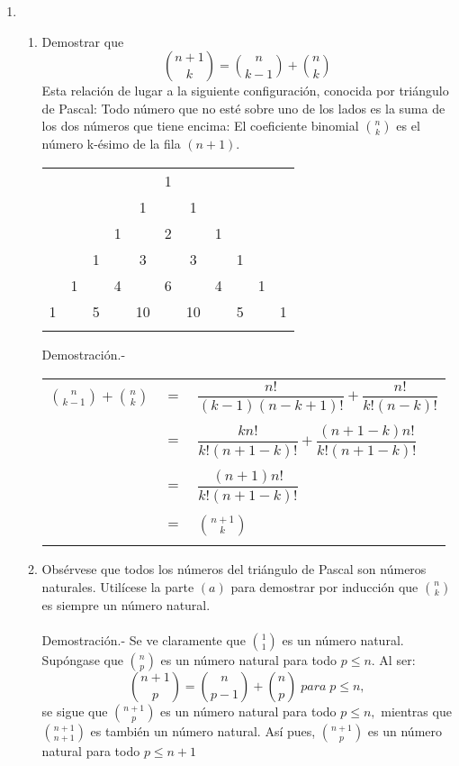\begin{enumerate}
\item 
\begin{enumerate}[\bfseries (a)]
\item Demostrar que $${n +1 \choose k} = {n \choose k - 1} + {n \choose k}$$ Esta relación de lugar a la siguiente configuración, conocida por triángulo de Pascal: Todo número que no esté sobre uno de los lados es la suma de los dos números que tiene encima: El coeficiente binomial ${n \choose k}$ es el número k-ésimo de la fila $(n+1)$.
\begin{center}
\begin{tabular}{ccccccccccc}
  &    &    &    &    &  1 &    &    &    &    &   \\
  &    &    &    &  1 &    &  1 &    &    &    &   \\
  &    &    &  1 &    &  2 &    &  1 &    &    &   \\
  &    &  1 &    &  3 &    &  3 &    &  1 &    &   \\
  &  1 &    &  4 &    &  6 &    &  4 &    &  1 &   \\
1 &    &  5 &    & 10 &    & 10 &    &  5 &    & 1 \\\\
\end{tabular}
\end{center}
Demostración.- \; \\
\begin{center}
\begin{tabular}{r c l}
$ {n \choose k-1}  +  {n \choose k} $&$=$&$\dfrac{n!}{(k-1)(n-k+1)!}+ \dfrac{n!}{k!(n-k)!}$\\\\
&$=$&$\dfrac{kn!}{k!(n+1-k)!} + \dfrac{(n+1-k)n!}{k!(n+1-k)!}$\\\\
&$=$&$\dfrac{(n+1)n!}{k!(n+1-k)!}$\\\\
&$=$&$ {n+1 \choose k} $\\\\
\end{tabular}
\end{center}

\item Obsérvese que todos los números del triángulo de Pascal son números naturales. Utilícese la parte $(a)$ para demostrar por inducción que $ {n \choose k}$ es siempre un número natural.\\\\
Demostración.- \; Se ve claramente que ${1 \choose 1}$ es un número natural. Supóngase que ${n \choose p}$ es un número natural para todo $p \leq n$. Al ser: $${ n+1 \choose p } = {n \choose p-1} + {n \choose p} \; para \; p \leq n,$$ se sigue que ${n+1 \choose p}$ es un número natural para todo $p \leq n,$ mientras que ${n+1 \choose n+1}$ es también un número natural. Así pues, ${n+1 \choose p}$ es un número natural para todo $p \leq n+1$\\\\


\end{enumerate}
\end{enumerate}
